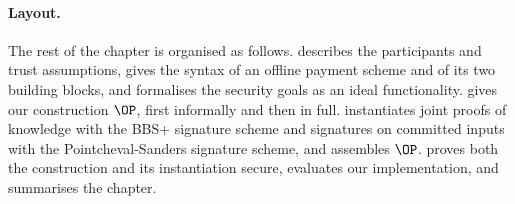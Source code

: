 \paragraph{Layout.} The rest of the chapter is organised as follows.
 describes the participants and trust
assumptions, gives the syntax of an offline payment scheme and of its two
building blocks, and formalises the security goals as an ideal functionality.
 gives our construction $\OP$, first informally
and then in full.  instantiates joint proofs of
knowledge with the BBS+ signature scheme and signatures on committed inputs
with the Pointcheval-Sanders signature scheme, and assembles $\OP$.
 proves both the construction and its instantiation
secure,  evaluates our implementation, and
 summarises the chapter.
